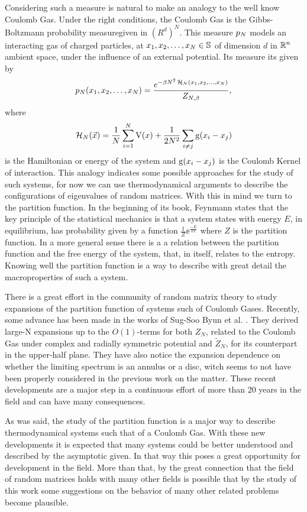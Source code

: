 Considering such a measure is natural to make an analogy to the well know Coulomb Gas. Under the right conditions, the Coulomb Gas is the Gibbs-Boltzmann probability measuregiven in $(R^d)^N$. This measure $p_N$ models an interacting gas of charged particles, at $x_1, x_2, \dots, x_N \in \mathbb{S}$ of dimension $d$ in $\mathbb{R}^n$ ambient space, under the influence of an external potential. Its measure its given by 
\begin{equation}
	p_N(x_1, x_2, \dots, x_N) = \frac{e^{-\beta N^2 \operatorname{\mathcal{H}}_N(x_1, x_2, \dots, x_N)}}{Z_{N,\beta}},
	\label{Equação: Medida Gas de Coulomb}
\end{equation}
where $$\operatorname{\mathcal{H}}_N(\vec{x}) = \frac{1}{N} \sum_{i = 1}^{N} \operatorname{V}(x) + \frac{1}{2N^2} \sum_{i \neq j} \operatorname{g}(x_i - x_j)$$ is the Hamiltonian or energy of the system and $\operatorname{g}(x_i - x_j)$ is the Coulomb Kernel of interaction. This analogy indicates some possible approaches for the study of such systems, for now we can use thermodynamical arguments to describe the configurations of eigenvalues of random matrices. With this in mind we turn to the partition function. In the beginning of its book, Feynmann states \cite{feynmanstatistical} that the key principle of the statistical mechanics is that a system states with energy $E$, in equilibrium, has probability given by a function $\frac{1}{Z} \ee^{\frac{-E}{kT}}$ where $Z$ is the partition function. In a more general sense there is a a relation between the partition function and the free energy of the system, that, in itself, relates to the entropy. Knowing well the partition function is a way to describe with great detail the macroproperties of such a system.

There is a great effort in the community of random matrix theory to study expansions of the partition function of systems such of Coulomb Gases. Recently, some advance has been made in the works of Sug-Soo Byun et al. \cite{Byun_2023}. They derived large-N expansions up to the $O(1)$-terms for both $Z_N$, related to the Coulomb Gas under complex and radially symmetric potential and $\tilde{Z}_N$, for its counterpart in the upper-half plane. They have also notice the expansion dependence on whether the limiting spectrum is an annulus or a disc, witch seems to not have been properly considered in the previous work on the matter. These recent developments are a major step in a continuous effort of more than 20 years in the field and can have many consequences. 

As was said, the study of the partition function is a major way to describe thermodynamical systems such that of a Coulomb Gas. With these new developments it is expected that many systems could be better understood and described by the asymptotic given. In that way this poses a great opportunity for development in the field. More than that, by the great connection that the field of random matrices holds with many other fields is possible that by the study of this work some suggestions on the behavior of many other related problems become plausible.





